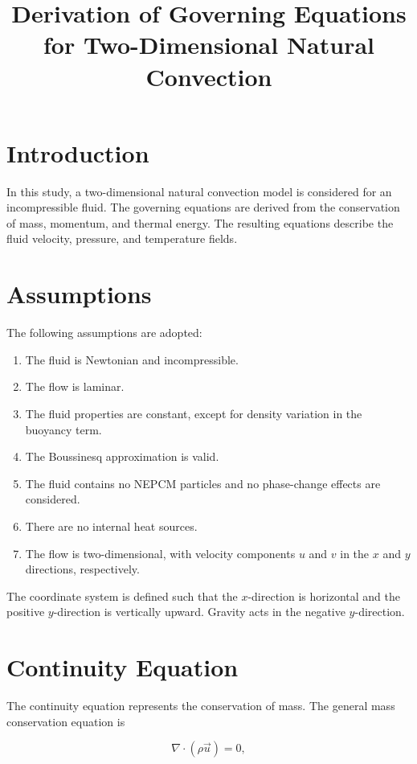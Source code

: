 \documentclass[preprint,3p,number]{elsarticle}
\title{Derivation of Governing Equations for Two-Dimensional Natural Convection}
\author{}
\date{}
\begin{document}
\maketitle

\section{Introduction}

In this study, a
two-dimensional natural convection model is considered for an
incompressible fluid. The governing equations are derived from the conservation of
mass, momentum, and thermal energy. The resulting equations
describe the fluid velocity, pressure, and temperature fields.

\section{Assumptions}

The following assumptions are adopted:

\begin{enumerate}
    \item The fluid is Newtonian and incompressible.
    \item The flow is laminar.
    \item The fluid properties are constant, except for density
    variation in the buoyancy term.
    \item The Boussinesq approximation is valid.
    \item The fluid contains no NEPCM particles and no phase-change
    effects are considered.
    \item There are no internal heat sources.
    \item The flow is two-dimensional, with velocity components
    $u$ and $v$ in the $x$ and $y$ directions, respectively.
\end{enumerate}

The coordinate system is defined such that the $x$-direction is
horizontal and the positive $y$-direction is vertically upward.
Gravity acts in the negative $y$-direction.

\section{Continuity Equation}

The continuity equation represents the conservation of mass.
The general mass conservation equation is

\begin{equation}
\nabla\cdot(\rho\vec{u})=0,
\label{eq:mass_general}
\end{equation}
\end{document}
